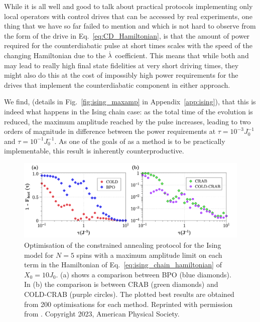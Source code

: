 While it is all well and good to talk about practical protocols implementing only local  operators with control drives that can be accessed by real experiments, one thing that we have so far failed to mention and which is not hard to observe from the form of the  drive in Eq.~\ref{eq:CD_Hamiltonian}, is that the amount of power required for the counterdiabatic pulse at short times scales with the speed of the changing Hamiltonian due to the $\dot{\lambda}$ coefficient. This means that while both  and  may lead to really high final state fidelities at very short driving times, they might also do this at the cost of impossibly high power requirements for the drives that implement the counterdiabatic component in either approach.

We find, (details in Fig.~\ref{fig:ising_maxamp} in Appendix~\ref{app:ising}), that this is indeed what happens in the Ising chain case: as the total time of the evolution is reduced, the maximum amplitude reached by the  pulse increases, leading to two orders of magnitude in difference between the power requirements at $\tau = 10^{-3}J_0^{-1}$ and $\tau = 10^{-1}J_0^{-1}$. As one of the goals of  as a method is to be practically implementable, this result is inherently counterproductive.

\begin{figure}[t]
    \centering
    \includegraphics[width=\linewidth]{images/IsingcConstrained.png} \caption[Applying COLD and COLD-CRAB to the Ising chain for 5 spins with constrained driving amplitudes.]{Optimisation of the constrained annealing protocol for the Ising model for $N=5$ spins with a maximum amplitude limit on each term in the Hamiltonian of Eq.~\eqref{eq:ising_chain_hamiltonian} of $X_0 = 10J_0$. (a) shows a comparison between BPO (blue diamonds). In (b) the comparison is between CRAB (green diamonds) and COLD-CRAB (purple circles). The plotted best results are obtained from 200 optimisations for each method. Reprinted with permission from \cite{cepaite_counterdiabatic_2023}. Copyright 2023, American Physical Society.}\label{fig:ising_constrained}
\end{figure}

